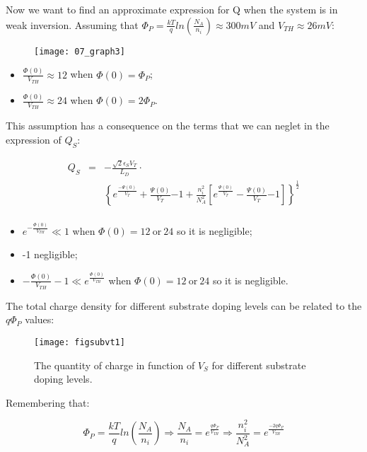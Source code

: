 \documentclass[a4paper, 12pt, twoside, openright]{report}
\begin{document}
Now we want to find an approximate expression for Q when the system is in weak inversion. Assuming that $\Phi_P = \frac{kT}{q}ln\left(\frac{N_A}{n_i}\right) \approx 300 mV$ and $V_{TH} \approx 26 mV$:

	\begin{figure}[H]
	\centering
	\texttt{[image: 07\_graph3]}
	\caption{}
	\label{tau}
	\end{figure}

\begin{itemize}
\item $\frac{\Phi(0)}{V_{TH}} \approx 12$ when $\Phi(0) = \Phi_P$;
\item$\frac{\Phi(0)}{V_{TH}} \approx 24$ when $\Phi(0) = 2 \Phi_P$.
\end{itemize}

This assumption has a consequence on the terms that we can neglet in the expression of $Q_{S}$:


	\begin{eqnarray*}
      Q_S&=&-\frac{\sqrt{2} \epsilon_S V_T}{L_D}\cdot \\
         & &\displaystyle\left\{{e^{\frac{-\Psi(0)}{V_T}}}+ {\frac{\Psi(0)}{V_T}}{-1}+
             \frac{n_i^2}{N_A^2}\left[\displaystyle {e^{ \frac{\Psi(0)}{V_T}}} -
             {\frac{\Psi(0)}{V_T}}{-1}\right]\right\}^{\frac{1}{2}}\\[3ex]      
    \end{eqnarray*}


\begin{itemize}
\item $e^{-\frac{\Phi(0)}{V_{TH}}} \ll 1$ when $\Phi(0) = 12\ \text{or}\ 24$ so it is negligible;
\item -1 negligible;
\item$-\frac{\Phi(0)}{V_{TH}} -1 \ll e^{\frac{\Phi(0)}{V_{TH}}}$ when $\Phi(0) = 12\ \text{or}\ 24$ so it is negligible.
\end{itemize}

The total charge density for different substrate doping levels can be related to the $q\Phi_P$ values:

	\begin{figure}[H]
	\centering
	\texttt{[image: figsubvt1]}
	\caption{The quantity of charge in function of $V_{S}$ for different substrate doping levels.}
	\label{}
	\end{figure}

Remembering that:

\begin{equation}
\Phi_P = \frac{kT}{q}ln\left(\frac{N_A}{n_i}\right) \Rightarrow \frac{N_A}{n_i} = e^{\frac{q \Phi_P}{V_{TH}}} \Rightarrow \frac{n_{i}^2}{N_{A}^2} = e^{\frac{-2q \Phi_P}{V_{TH}}}
\end{equation}
\end{document}
